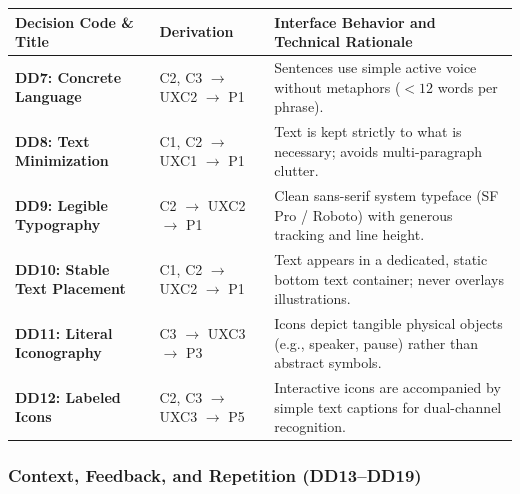 \begin{xltabular}{\textwidth}{|p{3.5cm}|p{2.5cm}|X|}
\hline
\textbf{Decision Code \& Title} & \textbf{Derivation} & \textbf{Interface Behavior and Technical Rationale} \\ \hline
\endhead
\textbf{DD7: Concrete Language} & C2, C3 $\rightarrow$ UXC2 $\rightarrow$ P1 & Sentences use simple active voice without metaphors ($<12$ words per phrase). \\ \hline
\textbf{DD8: Text Minimization} & C1, C2 $\rightarrow$ UXC1 $\rightarrow$ P1 & Text is kept strictly to what is necessary; avoids multi-paragraph clutter. \\ \hline
\textbf{DD9: Legible Typography} & C2 $\rightarrow$ UXC2 $\rightarrow$ P1 & Clean sans-serif system typeface (SF Pro / Roboto) with generous tracking and line height. \\ \hline
\textbf{DD10: Stable Text Placement} & C1, C2 $\rightarrow$ UXC2 $\rightarrow$ P1 & Text appears in a dedicated, static bottom text container; never overlays illustrations. \\ \hline
\textbf{DD11: Literal Iconography} & C3 $\rightarrow$ UXC3 $\rightarrow$ P3 & Icons depict tangible physical objects (e.g., speaker, pause) rather than abstract symbols. \\ \hline
\textbf{DD12: Labeled Icons} & C2, C3 $\rightarrow$ UXC3 $\rightarrow$ P5 & Interactive icons are accompanied by simple text captions for dual-channel recognition. \\ \hline
\end{xltabular}
\label{tab:c5_dd_lang}

\subsubsection{Context, Feedback, and Repetition (DD13--DD19)}

